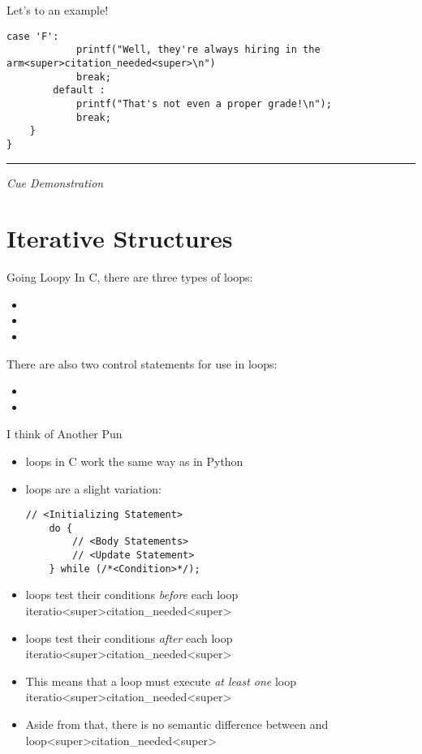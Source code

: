 \documentclass[11pt]{beamer}
\let\OldTexttt\texttt
\renewcommand{\texttt}[1]{\OldTexttt{\color{teal}{#1}}}
\begin{document}
\begin{frame}[fragile=singleslide]{Let's \texttt{switch} to an example! }
\begin{lstlisting}[style=C]
		case 'F':
			printf("Well, they're always hiring in the arm<super>citation_needed<super>\n")
			break;
		default :
			printf("That's not even a proper grade!\n");
			break;
	}
}
\end{lstlisting}
\hrule
\vspace{1em}
\emph{Cue Demonstration}
\end{frame}

\section[Loops]{Iterative Structures}
\begin{frame}{Going Loopy}
In C, there are three types of loops: 
\begin{itemize}
\item \texttt{while}
\item \texttt{do while}
\item \texttt{for}
\end{itemize}
There are also two control statements for use in loops:
\begin{itemize}
\item \texttt{break;}
\item \texttt{continue;}
\end{itemize}
\end{frame}

\begin{frame}[fragile=singleslide]{\texttt{do while} I think of Another Pun}
\begin{itemize}
\item \texttt{while} loops in C work the same way as in Python 
\item \texttt{do while} loops are a slight variation:
\begin{lstlisting}[style=C]
	// <Initializing Statement>
	do {
		// <Body Statements>
		// <Update Statement>
	} while (/*<Condition>*/); 
\end{lstlisting}
\item \texttt{while} loops test their conditions \emph{before} each loop iteratio<super>citation_needed<super>
\item \texttt{do while} loops test their conditions \emph {after} each loop iteratio<super>citation_needed<super>
\item This means that a \texttt{do while} loop must execute \emph{at least one} loop iteratio<super>citation_needed<super>  
\item Aside from that, there is no semantic difference between \texttt{while} and \texttt{do while} loop<super>citation_needed<super>  
\end{itemize}
\end{frame}
\end{document}
